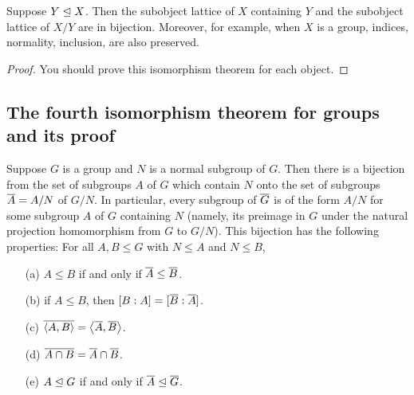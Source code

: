 \begin{thm}
    Suppose $Y\trianglelefteq X$.
    Then the subobject lattice of $X$ containing $Y$ and the subobject lattice of $X/Y$ are in bijection.
    Moreover, for example, when $X$ is a group, indices, normality, inclusion, are also preserved.
\end{thm}
\begin{proof}
    \color{brown}You should prove this isomorphism theorem for each object.\color{black}
\end{proof}


\subsection{The fourth isomorphism theorem for groups and its proof}
\begin{thm}
    Suppose $G$ is a group and $N$ is a normal subgroup of $G$.
    Then there is a bijection from the set of subgroups $A$ of $G$ which contain $N$ onto the set of subgroups $\overline{A}=A/N$ of $G/N$.
    In particular, every subgroup of $\overline{G}$ is of the form $A/N$ for some subgroup $A$ of $G$ containing $N$ (namely, its preimage in $G$ under the natural projection homomorphism from $G$ to $G/N$).
    This bijection has the following properties: For all $A, B\leq G$ with $N\leq A$ and $N\leq B$,
    \begin{enumerate}
        \item[(a)]
        {
            $A\leq B$ if and only if $\overline{A}\leq\overline{B}$.
        }
        \item[(b)]
        {
            if $A\leq B$, then $[B:A]=[\overline{B}: \overline{A}]$.
        }
        \item[(c)]
        {
            $\overline{{\left\langle{A, B}\right\rangle}}={\left\langle{\overline{A}, \overline{B}}\right\rangle}$.
        }
        \item[(d)]
        {
            $\overline{A\cap B}=\overline{A}\cap \overline{B}$.
        }
        \item[(e)]
        {
            $A\trianglelefteq G$ if and only if $\overline{A}\trianglelefteq \overline{G}$.
        }
    \end{enumerate}
\end{thm}
